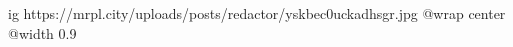  
 
 
 
 

\ifcmt
  ig https://mrpl.city/uploads/posts/redactor/yskbec0uckadhsgr.jpg
  @wrap center
  @width 0.9
\fi
